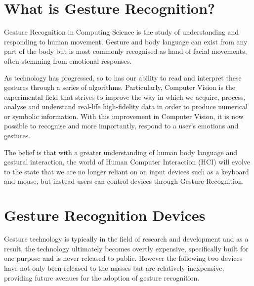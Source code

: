 \documentclass{l4proj}
\begin{document}
\section{What is Gesture Recognition?}
\vspace{-3mm}
Gesture Recognition in Computing Science is the study of understanding and responding to human movement. Gesture and body language can exist from any part of the body but is most commonly recognised as hand of facial movements, often stemming from emotional responses. 

As technology has progressed, so to has our ability to read and interpret these gestures through a series of algorithms. Particularly, Computer Vision is the experimental field that strives to improve the way in which we acquire, process, analyse and understand real-life high-fidelity data in order to produce numerical or symbolic information. With this improvement in Computer Vision, it is now possible to recognise and more importantly, respond to a user's emotions and gestures.

The belief is that with a greater understanding of human body language and gestural interaction, the world of Human Computer Interaction (HCI) will evolve to the state that we are no longer reliant on on input devices such as a keyboard and mouse, but instead users can control devices through Gesture Recognition. 

\section{Gesture Recognition Devices}
\vspace{-3mm}
Gesture technology is typically in the field of research and development and as a result, the technology ultimately becomes overtly expensive, specifically built for one purpose and is never released to public. However the following two devices have not only been released to the masses but are relatively inexpensive, providing future avenues for the adoption of gesture recognition. 
\end{document}

